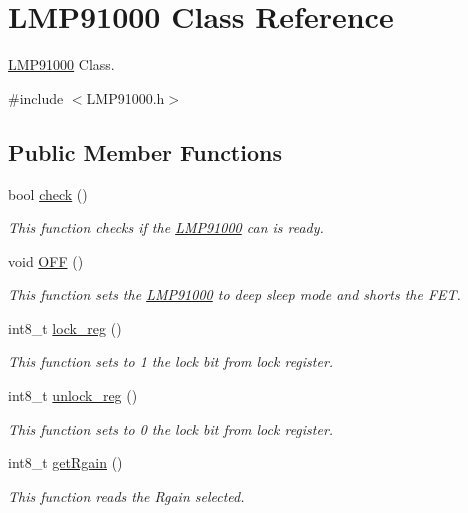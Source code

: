 \hypertarget{class_l_m_p91000}{}\section{L\+M\+P91000 Class Reference}
\label{class_l_m_p91000}


\hyperlink{class_l_m_p91000}{L\+M\+P91000} Class.  




{\ttfamily \#include $<$L\+M\+P91000.\+h$>$}

\subsection*{Public Member Functions}
\begin{DoxyCompactItemize}
\item 
bool \hyperlink{class_l_m_p91000_aa4d633f5110b5b348978ea36c2fddc7d}{check} ()
\begin{DoxyCompactList}\small\item\em This function checks if the \hyperlink{class_l_m_p91000}{L\+M\+P91000} can is ready. \end{DoxyCompactList}\item 
void \hyperlink{class_l_m_p91000_a0d6f9c83cfc7ad7f932a16c8884ee96a}{O\+FF} ()
\begin{DoxyCompactList}\small\item\em This function sets the \hyperlink{class_l_m_p91000}{L\+M\+P91000} to deep sleep mode and shorts the F\+ET. \end{DoxyCompactList}\item 
int8\+\_\+t \hyperlink{class_l_m_p91000_a32f6e928b7dc0b73915d898cb1397535}{lock\+\_\+reg} ()
\begin{DoxyCompactList}\small\item\em This function sets to 1 the lock bit from lock register. \end{DoxyCompactList}\item 
int8\+\_\+t \hyperlink{class_l_m_p91000_a961745db6875b9955726ea7a931961a9}{unlock\+\_\+reg} ()
\begin{DoxyCompactList}\small\item\em This function sets to 0 the lock bit from lock register. \end{DoxyCompactList}\item 
int8\+\_\+t \hyperlink{class_l_m_p91000_a47394a2f74c13bd97d3573c8fc8419e3}{get\+Rgain} ()
\begin{DoxyCompactList}\small\item\em This function reads the Rgain selected. \end{DoxyCompactList}\item 

\end{DoxyCompactItemize}
